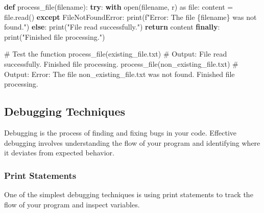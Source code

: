 \documentclass[
  letterpaper,
  DIV=11,
  numbers=noendperiod]{scrreprt}
\newenvironment{Shaded}{\begin{snugshade}}{\end{snugshade}}
\newcommand{\BuiltInTok}[1]{\textcolor[rgb]{0.00,0.23,0.31}{#1}}
\newcommand{\CommentTok}[1]{\textcolor[rgb]{0.37,0.37,0.37}{#1}}
\newcommand{\ControlFlowTok}[1]{\textcolor[rgb]{0.00,0.23,0.31}{\textbf{#1}}}
\newcommand{\ImportTok}[1]{\textcolor[rgb]{0.00,0.46,0.62}{#1}}
\newcommand{\KeywordTok}[1]{\textcolor[rgb]{0.00,0.23,0.31}{\textbf{#1}}}
\newcommand{\NormalTok}[1]{\textcolor[rgb]{0.00,0.23,0.31}{#1}}
\newcommand{\OperatorTok}[1]{\textcolor[rgb]{0.37,0.37,0.37}{#1}}
\newcommand{\PreprocessorTok}[1]{\textcolor[rgb]{0.68,0.00,0.00}{#1}}
\newcommand{\SpecialCharTok}[1]{\textcolor[rgb]{0.37,0.37,0.37}{#1}}
\newcommand{\SpecialStringTok}[1]{\textcolor[rgb]{0.13,0.47,0.30}{#1}}
\newcommand{\StringTok}[1]{\textcolor[rgb]{0.13,0.47,0.30}{#1}}
\begin{document}
\begin{Shaded}
\begin{Highlighting}[]
\KeywordTok{def}\NormalTok{ process\_file(filename):}
    \ControlFlowTok{try}\NormalTok{:}
        \ControlFlowTok{with} \BuiltInTok{open}\NormalTok{(filename, }\StringTok{\textquotesingle{}r\textquotesingle{}}\NormalTok{) }\ImportTok{as} \BuiltInTok{file}\NormalTok{:}
\NormalTok{            content }\OperatorTok{=} \BuiltInTok{file}\NormalTok{.read()}
    \ControlFlowTok{except} \PreprocessorTok{FileNotFoundError}\NormalTok{:}
        \BuiltInTok{print}\NormalTok{(}\SpecialStringTok{f"Error: The file \textquotesingle{}}\SpecialCharTok{\{}\NormalTok{filename}\SpecialCharTok{\}}\SpecialStringTok{\textquotesingle{} was not found."}\NormalTok{)}
    \ControlFlowTok{else}\NormalTok{:}
        \BuiltInTok{print}\NormalTok{(}\StringTok{"File read successfully."}\NormalTok{)}
        \ControlFlowTok{return}\NormalTok{ content}
    \ControlFlowTok{finally}\NormalTok{:}
        \BuiltInTok{print}\NormalTok{(}\StringTok{"Finished file processing."}\NormalTok{)}

\CommentTok{\# Test the function}
\NormalTok{process\_file(}\StringTok{\textquotesingle{}existing\_file.txt\textquotesingle{}}\NormalTok{)  }\CommentTok{\# Output: File read successfully. Finished file processing.}
\NormalTok{process\_file(}\StringTok{\textquotesingle{}non\_existing\_file.txt\textquotesingle{}}\NormalTok{)  }\CommentTok{\# Output: Error: The file \textquotesingle{}non\_existing\_file.txt\textquotesingle{} was not found. Finished file processing.}
\end{Highlighting}
\end{Shaded}

\subsection{Debugging Techniques}\label{debugging-techniques}

Debugging is the process of finding and fixing bugs in your code.
Effective debugging involves understanding the flow of your program and
identifying where it deviates from expected behavior.

\subsubsection{Print Statements}\label{print-statements}

One of the simplest debugging techniques is using print statements to
track the flow of your program and inspect variables.
\end{document}
